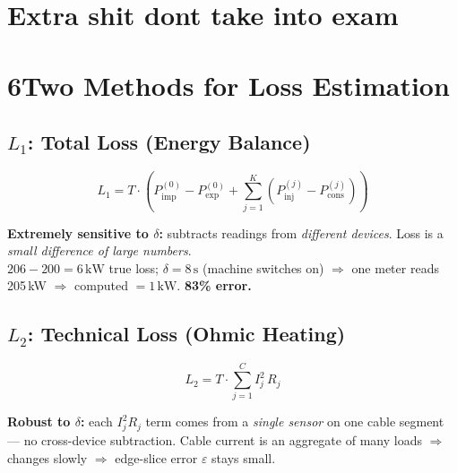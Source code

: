 \documentclass[10pt,a4paper]{article}
\begin{document}
\vspace{4pt}

\clearpage
\section{Extra shit dont take into exam}
\section*{6\quad Two Methods for Loss Estimation}

\begin{minipage}[t]{0.48\textwidth}
\subsection*{$L_1$: Total Loss (Energy Balance)}
\[
L_1 = T\!\cdot\!\left(P_\mathrm{imp}^{(0)} - P_\mathrm{exp}^{(0)} + \sum_{j=1}^{K}\!\left(P_\mathrm{inj}^{(j)} - P_\mathrm{cons}^{(j)}\right)\right)
\]
\begin{warnbox}
\small\textbf{Extremely sensitive to $\delta$:} subtracts readings from \emph{different devices}. Loss is a \emph{small difference of large numbers}.\\[2pt]
$206\!-\!200=6\,\text{kW}$ true loss; $\delta=8\,\text{s}$ (machine switches on) $\Rightarrow$ one meter reads 205\,kW $\Rightarrow$ computed $=1\,\text{kW}$. \textbf{83\% error.}
\end{warnbox}
\end{minipage}\hfill
\begin{minipage}[t]{0.48\textwidth}
\subsection*{$L_2$: Technical Loss (Ohmic Heating)}
\[
L_2 = T\cdot\sum_{j=1}^{C} I_j^2\, R_j
\]
\begin{keybox}
\small\textbf{Robust to $\delta$:} each $I_j^2 R_j$ term comes from a \emph{single sensor} on one cable segment --- no cross-device subtraction. Cable current is an aggregate of many loads $\Rightarrow$ changes slowly $\Rightarrow$ edge-slice error $\varepsilon$ stays small.
\end{keybox}
\end{minipage}

\vspace{3pt}
\end{document}
